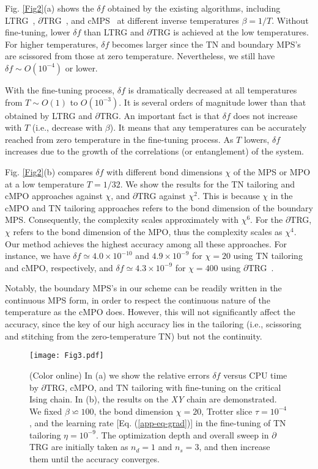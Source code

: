 \documentclass[aps,prl,twocolumn,superscriptaddress,a4paper,english,longbibliography]{revtex4-1}
\begin{document}
Fig. \ref{Fig2}(a) shows the $\delta f$ obtained by the existing algorithms, including LTRG~\cite{PhysRevLett.106.127202}, $\partial$TRG~\cite{PhysRevB.101.220409}, and cMPS~\cite{PhysRevLett.125.170604} at different inverse temperatures $\beta = 1/T$. Without fine-tuning, lower $\delta f$ than LTRG and $\partial$TRG is achieved at the low temperatures. For higher temperatures, $\delta f$ becomes larger since the TN and boundary MPS's are scissored from those at zero temperature. Nevertheless, we still have $\delta f \sim O(10^{-4})$ or lower.

With the fine-tuning process, $\delta f$ is dramatically decreased at all temperatures from $T \sim O(1)$ to $O(10^{-3})$. It is several orders of magnitude lower than that obtained by LTRG and $\partial$TRG. An important fact is that $\delta f$ does not increase with $T$ (i.e., decrease with $\beta$). It means that any temperatures can be accurately reached from zero temperature in the fine-tuning process. As $T$ lowers, $\delta f$ increases due to the growth of the correlations (or entanglement) of the system.

Fig. \ref{Fig2}(b) compares $\delta f$ with different bond dimensions $\chi$ of the MPS or MPO at a low temperature $T=1/32$. We show the results for the TN tailoring and cMPO approaches against $\chi$, and $\partial$TRG against $\chi^{2}$. This is because $\chi$ in the cMPO and TN tailoring approaches refers to the bond dimension of the boundary MPS. Consequently, the complexity scales approximately with $\chi^6$. For the $\partial$TRG, $\chi$ refers to the bond dimension of the MPO, thus the complexity scales as $\chi^4$. Our method achieves the highest accuracy among all these approaches. For instance, we have $\delta f \simeq 4.0\times10^{-10}$ and $4.9\times10^{-9}$ for $\chi=20$ using TN tailoring and cMPO, respectively, and $\delta f \simeq 4.3\times10^{-9}$ for $\chi=400$ using $\partial$TRG~\cite{dTRG}. 

Notably, the boundary MPS's in our scheme can be readily written in the continuous MPS form, in order to respect the continuous nature of the temperature as the cMPO does. However, this will not significantly affect the accuracy, since the key of our high accuracy lies in the tailoring (i.e., scissoring and stitching from the zero-temperature TN) but not the continuity. 

\begin{figure}[tbp]
	\centering
	\texttt{[image: Fig3.pdf]}
	\caption{(Color online) In (a) we show the relative errors $\delta f$ versus CPU time by $\partial$TRG, cMPO, and TN tailoring with fine-tuning on the critical Ising chain. In (b), the results on the {\it XY} chain are demonstrated. We fixed $\beta\backsimeq100$, the bond dimension $\chi=20$, Trotter slice $\tau=10^{-4}$, and the learning rate [Eq. (\ref{app-eq-grad})] in the fine-tuning of TN tailoring $\eta=10^{-9}$. The optimization depth and overall sweep in $\partial$TRG are initially taken as $n_{d}=1$ and $n_{s}=3$, and then increase them until the accuracy converges.}
	\label{Fig3} 
\end{figure}
\end{document}
